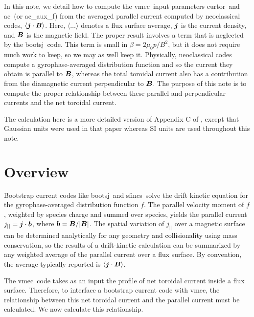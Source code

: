 \documentclass[11pt,letter]{article}
\title{Computing \vmec's \ac~current profile and \curtor~from a bootstrap current code}
\author{Matt Landreman}
\date{March 1, 2018}
\newcommand{\vect}[1]{\mbox{\boldmath $#1$}}
\newcommand{\vmec}{{\ttfamily vmec}}
\newcommand{\bootsj}{{\ttfamily bootsj}}
\newcommand{\sfincs}{{\ttfamily sfincs}}
\newcommand{\curtor}{{\ttfamily curtor}}
\newcommand{\ac}{{\ttfamily ac}}
\begin{document}
\maketitle

In this note, we detail how to compute the \vmec~input parameters \curtor~and \ac~(or {\ttfamily ac\_aux\_f})
from the averaged parallel current computed by neoclassical codes, $\langle \vect{j}\cdot\vect{B} \rangle$. Here,
$\langle \ldots \rangle$ denotes a flux surface average,  $\vect{j}$ is the current density, and $\vect{B}$ is the magnetic field. 
The proper result involves a term that is neglected by the \bootsj~code. This term is small
in $\beta = 2 \mu_0 p / B^2$, but it does not require much work to keep, so we may as well keep it.
Physically, neoclassical codes compute a gyrophase-averaged distribution function and so the current they obtain
is parallel to $\vect{B}$, whereas the total toroidal current also has a contribution from the diamagnetic
current perpendicular to $\vect{B}$. The purpose of this note is to compute the proper relationship between these 
parallel and perpendicular currents and the net toroidal current.


The calculation here is a more detailed version of Appendix C of \cite{LandremanCatto},
except that Gaussian units were used in that paper whereas
SI units are used throughout this note. 


\section{Overview}
Bootstrap current codes like \bootsj~and \sfincs~solve the drift kinetic equation
for the gyrophase-averaged distribution function $f$. The parallel velocity moment of $f$, weighted by species charge and summed over
species, yields the parallel current $j_{||} = \vect{j}\cdot\vect{b}$, where $\vect{b} = \vect{B} / |\vect{B}|$.
The spatial variation of $j_{||}$ over a magnetic surface can be determined analytically for any geometry and collisionality using mass conservation, so the results of a drift-kinetic calculation can be summarized by any weighted average of the parallel current over a flux surface. By convention, the average typically
reported is $\langle \vect{j}\cdot\vect{B}\rangle$.

The \vmec~code takes as an input the profile of net toroidal current inside a flux surface.
Therefore, to interface a bootstrap current code with \vmec, the relationship between this
net toroidal current and the parallel current must be calculated. We now calculate this relationship.
\end{document}
